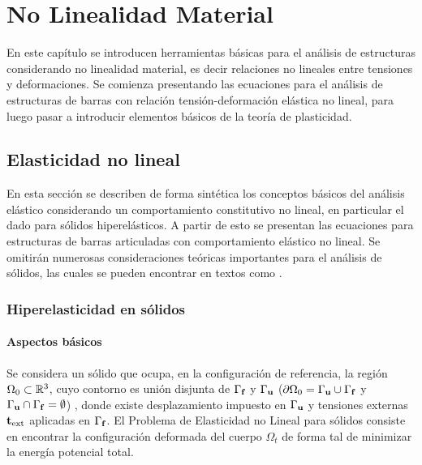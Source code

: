 \chapter{No Linealidad Material}\label{cap3MNA}
%
En este capítulo se introducen herramientas básicas para el análisis de estructuras considerando no linealidad material, es decir relaciones no lineales entre tensiones y deformaciones. %
%
Se comienza presentando las ecuaciones para el análisis de estructuras de barras con relación tensión-deformación elástica no lineal, para luego pasar a introducir elementos básicos de la teoría de plasticidad.

\section{Elasticidad no lineal} \label{sec:hiper}

En esta sección se describen de forma sintética los conceptos básicos del análisis elástico considerando un comportamiento constitutivo no lineal, en particular el dado para sólidos hiperelásticos. %
%
A partir de esto se presentan las ecuaciones para estructuras de barras articuladas con comportamiento elástico no lineal. %
%
Se omitirán numerosas consideraciones teóricas importantes para el análisis de sólidos, las cuales se pueden encontrar en textos como \citep{Holzapfel2000a,Gurtin1981}.

\subsection{Hiperelasticidad en sólidos} %
%

\subsubsection{Aspectos básicos}

Se considera un sólido que ocupa, en la configuración de referencia, la región $\Omega_0 \subset {\mathbb R}^3$, cuyo contorno es unión disjunta de $\Gamma_{\bf f}$ y $\Gamma_{\bf u}$ ($\partial \Omega_0 = \Gamma_{{\bf u}} \cup \Gamma_{{\bf f}}$ y $\Gamma_{{\bf u}} \cap \Gamma_{{\bf f}} = \emptyset$)
, donde existe desplazamiento impuesto en $\Gamma_{\bf u}$ y tensiones externas ${\bf t}_{\text{ext}}$ aplicadas en $\Gamma_{\bf f}$. %
%
El Problema de Elasticidad no Lineal para sólidos consiste en encontrar la configuración deformada del cuerpo $\Omega_t$ de forma tal de minimizar la energía potencial total. %

